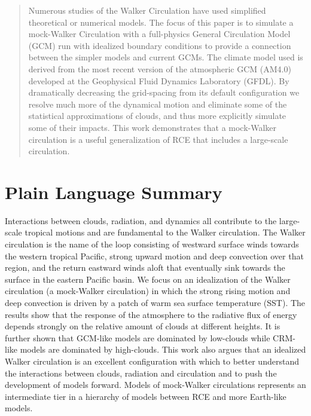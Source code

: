 \documentclass[draft]{agujournal2019}
\begin{document}
\begin{abstract}
Numerous studies of the Walker Circulation have used simplified 
theoretical or numerical models.  The focus of this paper is to simulate a mock-Walker
Circulation with a full-physics General Circulation Model (GCM) run with idealized boundary conditions to provide 
a connection between the simpler models 
and current GCMs.
The climate model used is derived from the most recent version of the atmospheric GCM (AM4.0) developed at the Geophysical Fluid Dynamics Laboratory (GFDL).  By dramatically decreasing the grid-spacing from its default configuration we resolve much more of the dynamical motion and eliminate 
some of the statistical approximations of clouds, and thus more explicitly simulate some of their impacts.
This work demonstrates that a mock-Walker circulation is a useful generalization of RCE that includes
a large-scale circulation.
%

\end{abstract}

\section*{Plain Language Summary}
Interactions between clouds, radiation, and dynamics all contribute
to the large-scale tropical motions and are fundamental to the Walker circulation.  
The Walker circulation is the name of the loop consisting of westward surface winds towards the western tropical Pacific, 
strong upward motion and deep convection over that region, 
and the return eastward winds aloft that 
eventually sink towards the surface in the eastern Pacific basin.  
We focus on an idealization of the Walker circulation (a mock-Walker circulation) 
in which the strong rising motion and deep convection is driven by a patch of warm sea surface temperature (SST).  
The results show that the response of the atmosphere to the 
radiative flux of energy depends strongly on the relative amount of clouds at different heights. %
It is further shown that GCM-like models are dominated by low-clouds while CRM-like models 
are dominated by high-clouds.  This work also argues that an idealized Walker circulation is an 
excellent configuration with which to better understand the interactions between clouds, radiation and circulation 
and to push the development of models forward.   Models of mock-Walker circulations represents
an intermediate tier in a hierarchy of models between RCE and more Earth-like models.  
\end{document}
